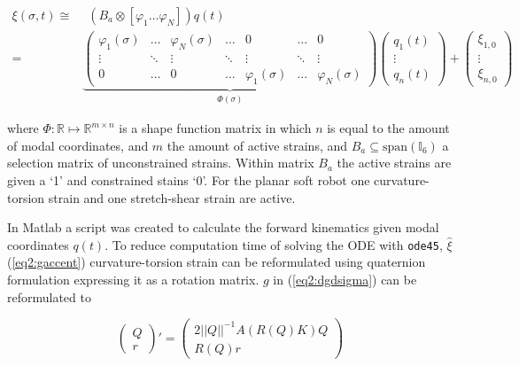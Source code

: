 \begin{equation}
\begin{aligned}
    \xi(\sigma,t) \cong & \hspace{5pt}  (B_a \otimes [ \varphi_1 \dots \varphi_N ])q(t)\\ = &  \underbrace{ \begin{pmatrix}
    \varphi_1(\sigma) & \dots  & \varphi_N(\sigma) & \dots     & 0      & \dots  &  0 \\
    \vdots    & \ddots & \vdots    & \ddots    & \vdots & \ddots & \vdots \\
    0         & \dots  & 0         & \dots     & \varphi_1(\sigma) & \dots & \varphi_N (\sigma)
    \end{pmatrix}}_{\Phi(\sigma)} \begin{pmatrix} q_1(t) \\ \vdots \\ q_n(t) \end{pmatrix} +  \begin{pmatrix} \xi_{1,0} \\ \vdots \\ \xi_{n,0}   \end{pmatrix}
    \end{aligned}
\label{eq2:xishape}
\end{equation}

where $\Phi : \mathbb{R} \mapsto \mathbb{R}^{m \times n}$ is a shape function matrix in which $n$ is equal to the amount of modal coordinates, and $m$ the amount of active strains, and $B_a \subseteq \text{span}(\mathbb{I}_6)$ a selection matrix of unconstrained strains. Within matrix $B_a$ the active strains are given a `1' and constrained stains `0'. For the planar soft robot one curvature-torsion strain and one stretch-shear strain are active. 


In Matlab \cite{MATLAB2020} a script was created to calculate the forward kinematics given modal coordinates $q(t)$. To reduce computation time of solving the ODE with \verb+ode45+, $\hat{\xi}$ (\ref{eq2:gaccent}) curvature-torsion strain can be reformulated using quaternion formulation expressing it as a rotation matrix.  $g$ in (\ref{eq2:dgdsigma}) can be reformulated to

\begin{equation}
    \begin{pmatrix} Q \\ r \end{pmatrix}' = \begin{pmatrix} 2 ||Q||^{-1} A(R(Q)K)Q \\ R(Q)r \end{pmatrix}
\end{equation}

